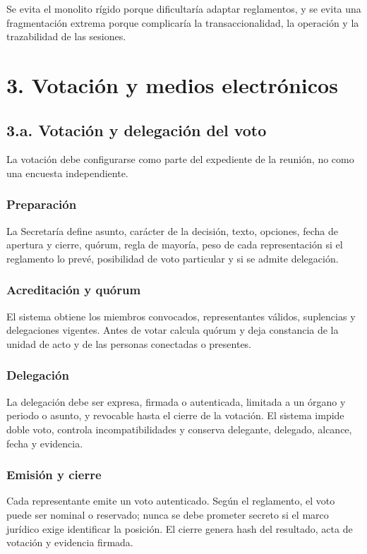 \documentclass[11pt,a4paper]{article}
\begin{document}
Se evita el monolito rígido porque dificultaría adaptar reglamentos, y se evita una fragmentación extrema porque complicaría la transaccionalidad, la operación y la trazabilidad de las sesiones.

\section{3. Votación y medios electrónicos}

\subsection{3.a. Votación y delegación del voto}

La votación debe configurarse como parte del expediente de la reunión, no como una encuesta independiente.

\subsubsection{Preparación}
La Secretaría define asunto, carácter de la decisión, texto, opciones, fecha de apertura y cierre, quórum, regla de mayoría, peso de cada representación si el reglamento lo prevé, posibilidad de voto particular y si se admite delegación.

\subsubsection{Acreditación y quórum}
El sistema obtiene los miembros convocados, representantes válidos, suplencias y delegaciones vigentes. Antes de votar calcula quórum y deja constancia de la unidad de acto y de las personas conectadas o presentes.

\subsubsection{Delegación}
La delegación debe ser expresa, firmada o autenticada, limitada a un órgano y periodo o asunto, y revocable hasta el cierre de la votación. El sistema impide doble voto, controla incompatibilidades y conserva delegante, delegado, alcance, fecha y evidencia.

\subsubsection{Emisión y cierre}
Cada representante emite un voto autenticado. Según el reglamento, el voto puede ser nominal o reservado; nunca se debe prometer secreto si el marco jurídico exige identificar la posición. El cierre genera hash del resultado, acta de votación y evidencia firmada.
\end{document}
